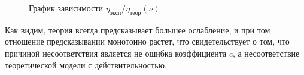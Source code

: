 \documentclass[a4paper]{article}
\begin{document}
\begin{figure}[h]
    \caption{График зависимости $\eta_{эксп}/\eta_{теор} (\nu)$}
    \label{fig:reduction_ratio}
    \newpage
\end{figure}

Как видим, теория всегда предсказывает большее ослабление, и при том отношение
предсказывании монотонно растет, что свидетельствует о том, что причиной несоответствия
является не ошибка коэффициента $c$, а несоответствие теоретической модели с
действительностью.
\end{document}
